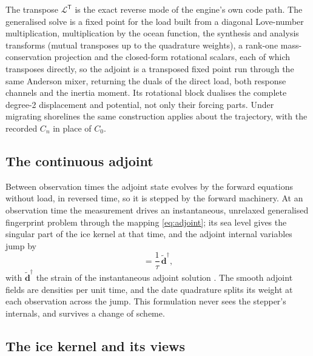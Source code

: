 \documentclass[11pt,a4paper]{article}
\numberwithin{equation}{section}
\begin{document}
The transpose $\mathcal{L}^{\mathsf T}$ is the exact reverse mode of the
engine's own code path. The generalised solve is a fixed point for the load
built from a diagonal Love-number multiplication, multiplication by the ocean
function, the synthesis and analysis transforms (mutual transposes up to the
quadrature weights), a rank-one mass-conservation projection and the
closed-form rotational scalars, each of which transposes directly, so the
adjoint is a transposed fixed point run through the same Anderson mixer,
returning the duals of the direct load, both response channels and the inertia
moment. Its rotational block dualises the complete degree-2 displacement and
potential, not only their forcing parts. Under migrating shorelines the same
construction applies about the trajectory, with the recorded $C_{n}$ in place
of $C_{0}$.

\subsection{The continuous adjoint}
\label{sec:contadj}

Between observation times the adjoint state evolves by the forward equations
without load, in reversed time, so it is stepped by the forward machinery. At
an observation time the measurement drives an instantaneous, unrelaxed
generalised fingerprint problem through the mapping \eqref{eq:adjoint}; its
sea level gives the singular part of the ice kernel at that time, and the
adjoint internal variables jump by
\begin{equation}
[\mathbf{m}^{\dagger}] = \frac{1}{\tau}\,\tilde{\mathbf{d}}^{\dagger},
\label{eq:jump}
\end{equation}
with $\tilde{\mathbf{d}}^{\dagger}$ the strain of the instantaneous adjoint
solution \citep[eq.~80]{YuEtAl2025}. The smooth adjoint fields are densities
per unit time, and the date quadrature splits its weight at each observation
across the jump. This formulation never sees the stepper's internals, and
survives a change of scheme.

\subsection{The ice kernel and its views}
\end{document}
